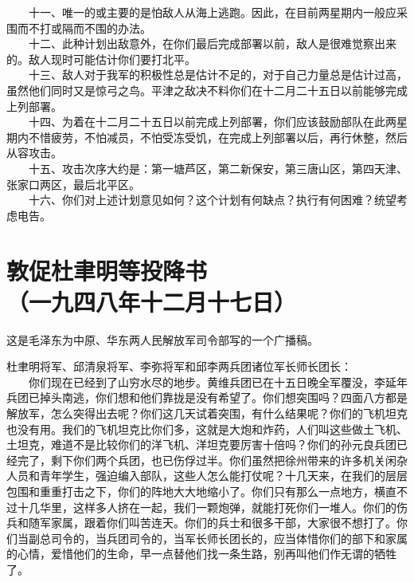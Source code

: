 \documentclass[cn,11pt,chinese]{elegantbook}
\def\myformat#1{\hfil\hfil #1}
\begin{document}
　　十一、唯一的或主要的是怕敌人从海上逃跑。因此，在目前两星期内一般应采围而不打或隔而不围的办法。\\
　　十二、此种计划出敌意外，在你们最后完成部署以前，敌人是很难觉察出来的。敌人现时可能估计你们要打北平。\\
　　十三、敌人对于我军的积极性总是估计不足的，对于自己力量总是估计过高，虽然他们同时又是惊弓之鸟。平津之敌决不料你们在十二月二十五日以前能够完成上列部署。\\
　　十四、为着在十二月二十五日以前完成上列部署，你们应该鼓励部队在此两星期内不惜疲劳，不怕减员，不怕受冻受饥，在完成上列部署以后，再行休整，然后从容攻击。\\
　　十五、攻击次序大约是：第一塘芦区，第二新保安，第三唐山区，第四天津、张家口两区，最后北平区。\\
　　十六、你们对上述计划意见如何？这个计划有何缺点？执行有何困难？统望考虑电告。\\
\newpage\section*{\myformat{敦促杜聿明等投降书}\\\myformat{（一九四八年十二月十七日）}}
\begin{introduction}\item  这是毛泽东为中原、华东两人民解放军司令部写的一个广播稿。\end{introduction}
杜聿明将军、邱清泉将军、李弥将军和邱李两兵团诸位军长师长团长：\\
　　你们现在已经到了山穷水尽的地步。黄维兵团已在十五日晚全军覆没，李延年兵团已掉头南逃，你们想和他们靠拢是没有希望了。你们想突围吗？四面八方都是解放军，怎么突得出去呢？你们这几天试着突围，有什么结果呢？你们的飞机坦克也没有用。我们的飞机坦克比你们多，这就是大炮和炸药，人们叫这些做土飞机、土坦克，难道不是比较你们的洋飞机、洋坦克要厉害十倍吗？你们的孙元良兵团已经完了，剩下你们两个兵团，也已伤俘过半。你们虽然把徐州带来的许多机关闲杂人员和青年学生，强迫编入部队，这些人怎么能打仗呢？十几天来，在我们的层层包围和重重打击之下，你们的阵地大大地缩小了。你们只有那么一点地方，横直不过十几华里，这样多人挤在一起，我们一颗炮弹，就能打死你们一堆人。你们的伤兵和随军家属，跟着你们叫苦连天。你们的兵士和很多干部，大家很不想打了。你们当副总司令的，当兵团司令的，当军长师长团长的，应当体惜你们的部下和家属的心情，爱惜他们的生命，早一点替他们找一条生路，别再叫他们作无谓的牺牲了。\\
\end{document}
